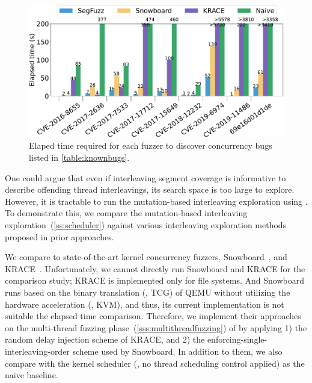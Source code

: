 \begin{figure}[t]
  \centering
  \includegraphics[width=0.99\linewidth]{fig/comparison_graph_time-crop.pdf}
  \caption{Elaped time required for each fuzzer to discover
    concurrency bugs listed in \autoref{table:knownbugs}.}
  \label{fig:eval:comparison-time}
  \vspace{-8pt}
\end{figure}


%
One could argue that even if interleaving segment coverage is
informative to describe offending thread interleavings, 
its search space is too large to explore.
%
However, it is tractable to run the mutation-based interleaving exploration
using \intcov.
To demonstrate this, we compare the mutation-based interleaving
exploration~(\autoref{ss:scheduler}) against various interleaving
exploration methods proposed in prior approaches.

%
We compare \sys to state-of-the-art kernel concurrency fuzzers,
Snowboard~\cite{snowboard}, and KRACE~\cite{krace}.
%
Unfortunately, we cannot directly run Snowboard and KRACE for the
comparison study; KRACE is implemented only for file systems. And
Snowboard runs based on the binary translation (\ie, TCG) of QEMU
without utilizing the hardware acceleration (\ie, KVM), and thus, its
current implementation is not suitable the elapsed time comparison.
%
Therefore, we implement their approaches on the multi-thread fuzzing
phase~(\autoref{sss:multithreadfuzzing}) of \sys by applying 1) the
random delay injection scheme of KRACE, and 2) the
enforcing-single-interleaving-order scheme used by Snowboard.
%
In addition to them, we also compare with the kernel scheduler 
(\ie, no thread scheduling control applied) as the naive baseline.

